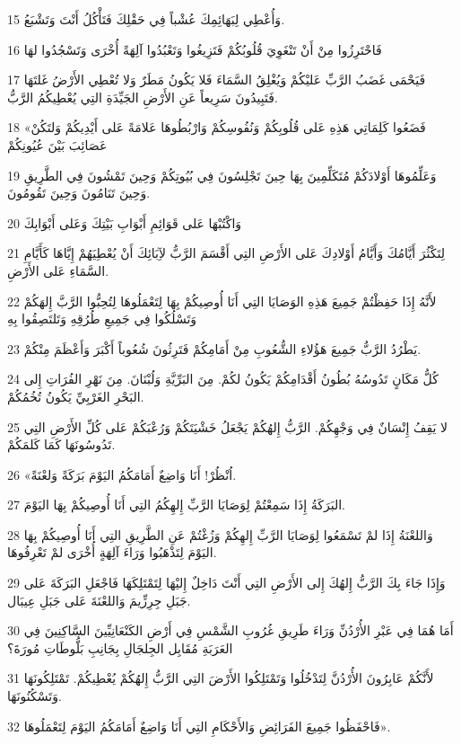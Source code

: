 \par 15 وَأُعْطِي لِبَهَائِمِكَ عُشْباً فِي حَقْلِكَ فَتَأْكُلُ أَنْتَ وَتَشْبَعُ.
\par 16 فَاحْتَرِزُوا مِنْ أَنْ تَنْغَوِيَ قُلُوبُكُمْ فَتَزِيغُوا وَتَعْبُدُوا آلِهَةً أُخْرَى وَتَسْجُدُوا لهَا
\par 17 فَيَحْمَى غَضَبُ الرَّبِّ عَليْكُمْ وَيُغْلِقُ السَّمَاءَ فَلا يَكُونُ مَطَرٌ وَلا تُعْطِي الأَرْضُ غَلتَهَا فَتَبِيدُونَ سَرِيعاً عَنِ الأَرْضِ الجَيِّدَةِ التِي يُعْطِيكُمُ الرَّبُّ.
\par 18 «فَضَعُوا كَلِمَاتِي هَذِهِ عَلى قُلُوبِكُمْ وَنُفُوسِكُمْ وَارْبُطُوهَا عَلامَةً عَلى أَيْدِيكُمْ وَلتَكُنْ عَصَائِبَ بَيْنَ عُيُونِكُمْ
\par 19 وَعَلِّمُوهَا أَوْلادَكُمْ مُتَكَلِّمِينَ بِهَا حِينَ تَجْلِسُونَ فِي بُيُوتِكُمْ وَحِينَ تَمْشُونَ فِي الطَّرِيقِ وَحِينَ تَنَامُونَ وَحِينَ تَقُومُونَ.
\par 20 وَاكْتُبْهَا عَلى قَوَائِمِ أَبْوَابِ بَيْتِكَ وَعَلى أَبْوَابِكَ
\par 21 لِتَكْثُرَ أَيَّامُكَ وَأَيَّامُ أَوْلادِكَ عَلى الأَرْضِ التِي أَقْسَمَ الرَّبُّ لآِبَائِكَ أَنْ يُعْطِيَهُمْ إِيَّاهَا كَأَيَّامِ السَّمَاءِ عَلى الأَرْضِ.
\par 22 لأَنَّهُ إِذَا حَفِظْتُمْ جَمِيعَ هَذِهِ الوَصَايَا التِي أَنَا أُوصِيكُمْ بِهَا لِتَعْمَلُوهَا لِتُحِبُّوا الرَّبَّ إِلهَكُمْ وَتَسْلُكُوا فِي جَمِيعِ طُرُقِهِ وَتَلتَصِقُوا بِهِ
\par 23 يَطْرُدُ الرَّبُّ جَمِيعَ هَؤُلاءِ الشُّعُوبِ مِنْ أَمَامِكُمْ فَتَرِثُونَ شُعُوباً أَكْبَرَ وَأَعْظَمَ مِنْكُمْ.
\par 24 كُلُّ مَكَانٍ تَدُوسُهُ بُطُونُ أَقْدَامِكُمْ يَكُونُ لكُمْ. مِنَ البَرِّيَّةِ وَلُبْنَانَ. مِنَ نَهْرِ الفُرَاتِ إِلى البَحْرِ الغَرْبِيِّ يَكُونُ تُخُمُكُمْ.
\par 25 لا يَقِفُ إِنْسَانٌ فِي وَجْهِكُمْ. الرَّبُّ إِلهُكُمْ يَجْعَلُ خَشْيَتَكُمْ وَرُعْبَكُمْ عَلى كُلِّ الأَرْضِ التِي تَدُوسُونَهَا كَمَا كَلمَكُمْ.
\par 26 «اُنْظُرْ! أَنَا وَاضِعٌ أَمَامَكُمُ اليَوْمَ بَرَكَةً وَلعْنَةً.
\par 27 البَرَكَةُ إِذَا سَمِعْتُمْ لِوَصَايَا الرَّبِّ إِلهِكُمُ التِي أَنَا أُوصِيكُمْ بِهَا اليَوْمَ.
\par 28 وَاللعْنَةُ إِذَا لمْ تَسْمَعُوا لِوَصَايَا الرَّبِّ إِلهِكُمْ وَزُغْتُمْ عَنِ الطَّرِيقِ التِي أَنَا أُوصِيكُمْ بِهَا اليَوْمَ لِتَذْهَبُوا وَرَاءَ آلِهَةٍ أُخْرَى لمْ تَعْرِفُوهَا.
\par 29 وَإِذَا جَاءَ بِكَ الرَّبُّ إِلهُكَ إِلى الأَرْضِ التِي أَنْتَ دَاخِلٌ إِليْهَا لِتَمْتَلِكَهَا فَاجْعَلِ البَرَكَةَ عَلى جَبَلِ جِرِزِّيمَ وَاللعْنَةَ عَلى جَبَلِ عِيبَال.
\par 30 أَمَا هُمَا فِي عَبْرِ الأُرْدُنِّ وَرَاءَ طَرِيقِ غُرُوبِ الشَّمْسِ فِي أَرْضِ الكَنْعَانِيِّينَ السَّاكِنِينَ فِي العَرَبَةِ مُقَابِل الجِلجَالِ بِجَانِبِ بَلُّوطَاتِ مُورَةَ؟
\par 31 لأَنَّكُمْ عَابِرُونَ الأُرْدُنَّ لِتَدْخُلُوا وَتَمْتَلِكُوا الأَرْضَ التِي الرَّبُّ إِلهُكُمْ يُعْطِيكُمْ. تَمْتَلِكُونَهَا وَتَسْكُنُونَهَا.
\par 32 فَاحْفَظُوا جَمِيعَ الفَرَائِضِ وَالأَحْكَامِ التِي أَنَا وَاضِعٌ أَمَامَكُمُ اليَوْمَ لِتَعْمَلُوهَا».

